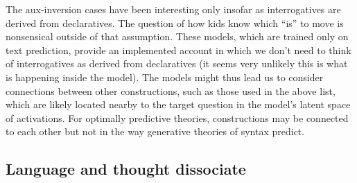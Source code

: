 \documentclass[output=paper,colorlinks,citecolor=brown
]{langscibook}
\begin{document}
The aux-inversion cases have been interesting only insofar as interrogatives are derived from declaratives. The question of how kids know which ``is'' to move is nonsensical outside of that assumption. These models, which are trained only on text prediction, provide an implemented account in which we don't need to think of interrogatives as derived from declaratives (it seems very unlikely this is what is happening inside the model). The models might thus lead us to consider connections between other constructions, such as those used in the above list, which are likely located nearby to the target question in the model's latent space of activations. For optimally predictive theories, constructions may be connected to each other but not in the way generative theories of syntax predict.
   





\subsection*{Language and thought dissociate}
\end{document}
